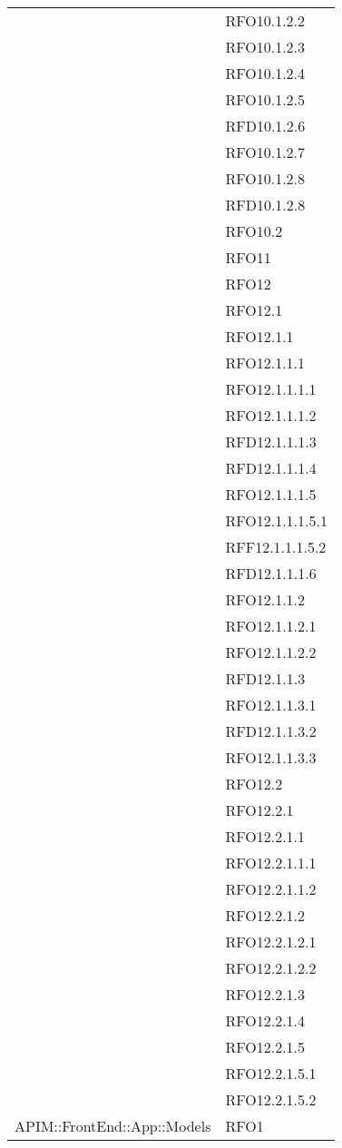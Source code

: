 \begin{longtable}{ p{12cm} | p{4cm} }
			& RFO10.1.2.2 \\
			& RFO10.1.2.3 \\
			& RFO10.1.2.4 \\
			& RFO10.1.2.5 \\
			& RFD10.1.2.6 \\
			& RFO10.1.2.7 \\
			& RFO10.1.2.8 \\
			& RFD10.1.2.8 \\
			& RFO10.2 \\
			& RFO11 \\
			& RFO12 \\
			& RFO12.1 \\
			& RFO12.1.1 \\
			& RFO12.1.1.1 \\
			& RFO12.1.1.1.1 \\
			& RFO12.1.1.1.2 \\
			& RFD12.1.1.1.3 \\
			& RFD12.1.1.1.4 \\
			& RFO12.1.1.1.5 \\
			& RFO12.1.1.1.5.1 \\
			& RFF12.1.1.1.5.2 \\
			& RFD12.1.1.1.6 \\
			& RFO12.1.1.2 \\
			& RFO12.1.1.2.1 \\
			& RFO12.1.1.2.2 \\
			& RFD12.1.1.3 \\
			& RFO12.1.1.3.1 \\
			& RFD12.1.1.3.2 \\
			& RFO12.1.1.3.3 \\
			& RFO12.2 \\
			& RFO12.2.1 \\
			& RFO12.2.1.1 \\
			& RFO12.2.1.1.1 \\
			& RFO12.2.1.1.2 \\
			& RFO12.2.1.2 \\
			& RFO12.2.1.2.1 \\
			& RFO12.2.1.2.2 \\
			& RFO12.2.1.3 \\
			& RFO12.2.1.4 \\
			& RFO12.2.1.5 \\
			& RFO12.2.1.5.1 \\
			& RFO12.2.1.5.2 \\
			\hline
			APIM::FrontEnd::App::Models
			& RFO1 \\

\end{longtable}
